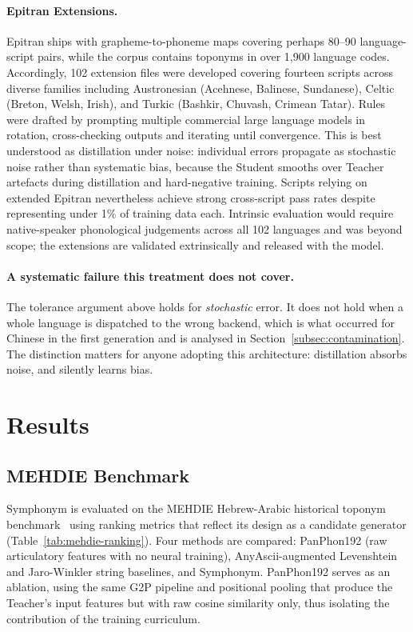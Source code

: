 \documentclass[11pt,a4paper]{article}
\begin{document}
\paragraph{Epitran Extensions.} Epitran ships with grapheme-to-phoneme maps covering perhaps 80--90 language-script pairs, while the corpus contains toponyms in over 1,900 language codes. Accordingly, 102 extension files were developed covering fourteen scripts across diverse families including Austronesian (Acehnese, Balinese, Sundanese), Celtic (Breton, Welsh, Irish), and Turkic (Bashkir, Chuvash, Crimean Tatar). Rules were drafted by prompting multiple commercial large language models in rotation, cross-checking outputs and iterating until convergence. This is best understood as distillation under noise: individual errors propagate as stochastic noise rather than systematic bias, because the Student smooths over Teacher artefacts during distillation and hard-negative training. Scripts relying on extended Epitran nevertheless achieve strong cross-script pass rates despite representing under 1\% of training data each. Intrinsic evaluation would require native-speaker phonological judgements across all 102 languages and was beyond scope; the extensions are validated extrinsically and released with the model.

\paragraph{A systematic failure this treatment does not cover.} The tolerance argument above holds for \emph{stochastic} error. It does not hold when a whole language is dispatched to the wrong backend, which is what occurred for Chinese in the first generation and is analysed in Section~\ref{subsec:contamination}. The distinction matters for anyone adopting this architecture: distillation absorbs noise, and silently learns bias.
\section{Results}
\label{sec:results}

\subsection{MEHDIE Benchmark}
\label{subsec:mehdie}

Symphonym is evaluated on the MEHDIE Hebrew-Arabic historical toponym benchmark~\citep{mehdie2025} using ranking metrics that reflect its design as a candidate generator (Table~\ref{tab:mehdie-ranking}). Four methods are compared: PanPhon192 (raw articulatory features with no neural training), AnyAscii-augmented Levenshtein and Jaro-Winkler string baselines, and Symphonym. PanPhon192 serves as an ablation, using the same G2P pipeline and positional pooling that produce the Teacher's input features but with raw cosine similarity only, thus isolating the contribution of the training curriculum.
\end{document}
